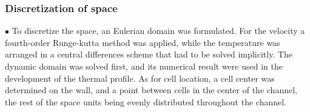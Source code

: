 \documentclass[xcolor=dvipsnames,8pt,aspectratio=34]{beamer}
\begin{document}
		\begin{frame}
			\frametitle{Discretization of space}
			\begin{minipage}[h!]{0.5\textwidth}
			$\bullet$ To discretize the space, an Eulerian domain was formulated. For the velocity a fourth-order Runge-kutta method was applied, while the temperature was arranged in a central differences scheme that had to be solved implicitly. The dynamic domain was solved first, and its numerical result were used in the development of the thermal profile. As for cell location, a cell center was determined on the wall, and a point between cells in the center of the channel, the rest of the space units being evenly distributed throughout the channel.
			\end{minipage}\hfill
			\begin{minipage}[h!]{0.45\textwidth}
			\begin{figure}
				\centering

\end{figure}
\end{minipage}
\end{frame}
\end{document}
